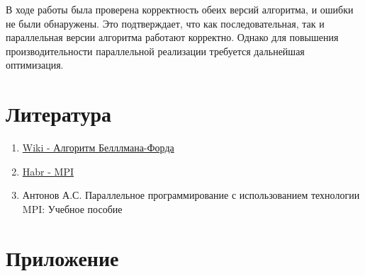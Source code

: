 \documentclass[12pt]{article}
\begin{document}
В ходе работы была проверена корректность обеих версий алгоритма, и ошибки не были обнаружены. Это подтверждает, что как последовательная, так и параллельная версии алгоритма работают корректно. Однако для повышения производительности параллельной реализации требуется дальнейшая оптимизация.

\newpage
\section*{Литература}

\begin{enumerate}
    \item \href{https://ru.wikipedia.org/wiki/%D0%90%D0%BB%D0%B3%D0%BE%D1%80%D0%B8%D1%82%D0%BC_%D0%91%D0%B5%D0%BB%D0%BB%D0%BC%D0%B0%D0%BD%D0%B0_%E2%80%94_%D0%A4%D0%BE%D1%80%D0%B4%D0%B0}{Wiki - Алгоритм Белллмана-Форда}
    
    \item \href{https://habr.com/ru/articles/548266/}{Habr - MPI}
    
    \item Антонов А.С. Параллельное программирование с использованием технологии MPI: Учебное пособие
\end{enumerate}

\newpage
\section*{Приложение}
\end{document}
